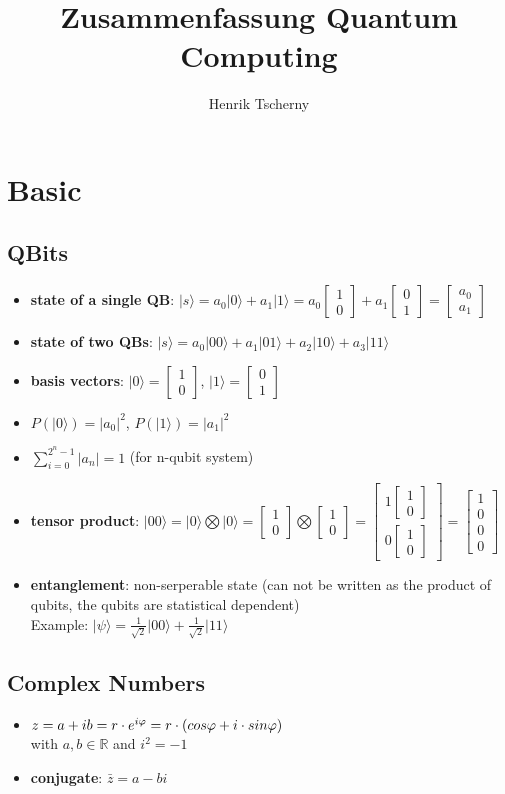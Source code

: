 \documentclass[12pt,a4paper]{article}
\title{Zusammenfassung Quantum Computing}
\author{Henrik Tscherny}
\newcommand{\ket}[1]{\vert #1 \rangle}
\newcommand*\vv[2]{
    \begin{bmatrix}#1\\#2\end{bmatrix}
}
\newcommand*\vvvv[4]{
    \begin{bmatrix}#1\\#2\\#3\\#4\end{bmatrix}
}
\begin{document}
\maketitle
\tableofcontents

\section{Basic}
\subsection{QBits}
\begin{itemize}
\item \textbf{state of a single QB}: $\ket{s} = a_0 \ket{0} + a_1 \ket{1} = a_0 \vv{1}{0} + a_1 \vv{0}{1} = \vv{a_0}{a_1}$
\item \textbf{state of two QBs}: $\ket{s} = a_0 \ket{00} + a_1 \ket{01} + a_2 \ket{10} + a_3 \ket{11}$
\item \textbf{basis vectors}: $\ket{0} = \vv{1}{0}$,  $\ket{1} = \vv{0}{1}$
\item $P(\ket{0}) = |a_0|^2$, $P(\ket{1}) = |a_1|^2$
\item $\displaystyle \sum_{i=0}^{2^n-1} |a_n| = 1$ (for n-qubit system)
\item \textbf{tensor product}: $\ket{00} = \ket{0} \bigotimes \ket{0} = \vv{1}{0} \bigotimes \vv{1}{0} = \vv{1\vv{1}{0}}{0\vv{1}{0}} = \vvvv{1}{0}{0}{0}$
\item \textbf{entanglement}: non-serperable state (can not be written as the product of qubits, the qubits are statistical dependent)\\
Example: $\ket{\psi} = \frac{1}{\sqrt{2}}\ket{00} + \frac{1}{\sqrt{2}}\ket{11}$
\end{itemize}

\subsection{Complex Numbers}
\begin{itemize}
\item $z = a + ib\\= r \cdot e^{i\varphi}\\= r\cdot (cos \varphi + i \cdot sin \varphi)$\\with $a,b \in \mathbb{R}$ and $i^2 = -1$
\item \textbf{conjugate}: $\bar{z}= a-bi$
\end{itemize}
\end{document}
